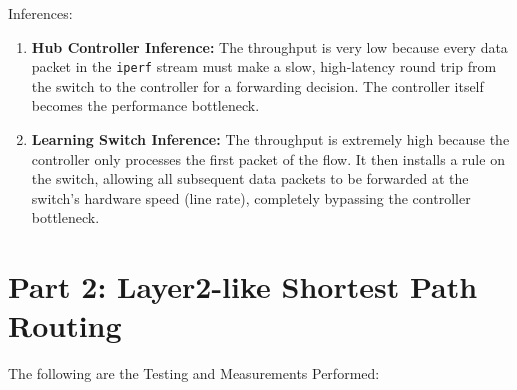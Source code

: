 \documentclass[12pt]{article}
\begin{document}
Inferences:
\begin{enumerate}
    \item \textbf{Hub Controller Inference:} The throughput is very low because every data packet in the \texttt{iperf} stream must make a slow, high-latency round trip from the switch to the controller for a forwarding decision. The controller itself becomes the performance bottleneck.
    \item \textbf{Learning Switch Inference:} The throughput is extremely high because the controller only processes the first packet of the flow. It then installs a rule on the switch, allowing all subsequent data packets to be forwarded at the switch's hardware speed (line rate), completely bypassing the controller bottleneck.
\end{enumerate}


\section{Part 2: Layer2-like Shortest Path Routing}

The following are the Testing and Measurements Performed:
\end{document}
